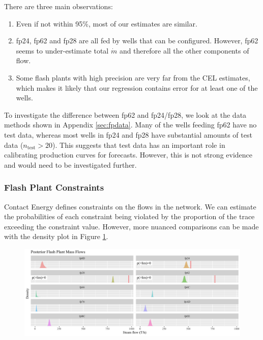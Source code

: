 \documentclass[a4paper, 12pt]{article}
\begin{document}
There are three main observations:

\begin{enumerate}
\item Even if not within 95\%, most of our estimates are similar.
\item fp24, fp62 and fp28 are all fed by wells that can be configured. However, fp62 seems to under-estimate total $\dot{m}$ and therefore all the other components of flow.
\item Some flash plants with high precision are very far from the CEL estimates, which makes it likely that our regression contains error for at least one of the wells.
\end{enumerate}

To investigate the difference between fp62 and fp24/fp28, we look at the data methods shown in Appendix \ref{sec:fpdata}. Many of the wells feeding fp62 have no test data, whereas most wells in fp24 and fp28 have substantial amounts of test data ($n_\text{test} > 20$). This suggests that test data has an important role in calibrating production curves for forecasts. However, this is not strong evidence and would need to be investigated further.

\subsubsection{Flash Plant Constraints}
Contact Energy defines constraints on the flows in the network. We can estimate the probabilities of each constraint being violated by the proportion of the trace exceeding the constraint value. However, more nuanced comparisons can be made with the density plot in Figure \ref{fig:constraints}.

\begin{figure}
\centering
  \includegraphics[width=\linewidth]{media/constraints}
  \label{fig:constraints}
\end{figure}
\end{document}
